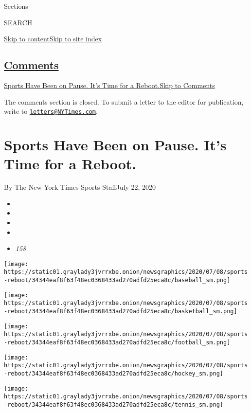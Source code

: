 Sections

SEARCH

\protect\hyperlink{site-content}{Skip to
content}\protect\hyperlink{site-index}{Skip to site index}

\hypertarget{comments}{%
\subsection{\texorpdfstring{\protect\hyperlink{commentsContainer}{Comments}}{Comments}}\label{comments}}

\href{}{Sports Have Been on Pause. It's Time for a Reboot.}\href{}{Skip
to Comments}

The comments section is closed. To submit a letter to the editor for
publication, write to
\href{mailto:letters@NYTimes.com}{\nolinkurl{letters@NYTimes.com}}.

\hypertarget{sports-have-been-on-pause-its-time-for-a-reboot}{%
\section{Sports Have Been on Pause. It's Time for a
Reboot.}\label{sports-have-been-on-pause-its-time-for-a-reboot}}

By The New York Times Sports StaffJuly 22, 2020

\begin{itemize}
\item
\item
\item
\item
\item
  \emph{158}
\end{itemize}

\texttt{[image: https://static01.graylady3jvrrxbe.onion/newsgraphics/2020/07/08/sports-reboot/34344eaf8f63f48ec0368433ad270adfd25eca8c/baseball\_sm.png]}

\texttt{[image: https://static01.graylady3jvrrxbe.onion/newsgraphics/2020/07/08/sports-reboot/34344eaf8f63f48ec0368433ad270adfd25eca8c/basketball\_sm.png]}

\texttt{[image: https://static01.graylady3jvrrxbe.onion/newsgraphics/2020/07/08/sports-reboot/34344eaf8f63f48ec0368433ad270adfd25eca8c/football\_sm.png]}

\texttt{[image: https://static01.graylady3jvrrxbe.onion/newsgraphics/2020/07/08/sports-reboot/34344eaf8f63f48ec0368433ad270adfd25eca8c/hockey\_sm.png]}

\texttt{[image: https://static01.graylady3jvrrxbe.onion/newsgraphics/2020/07/08/sports-reboot/34344eaf8f63f48ec0368433ad270adfd25eca8c/tennis\_sm.png]}

